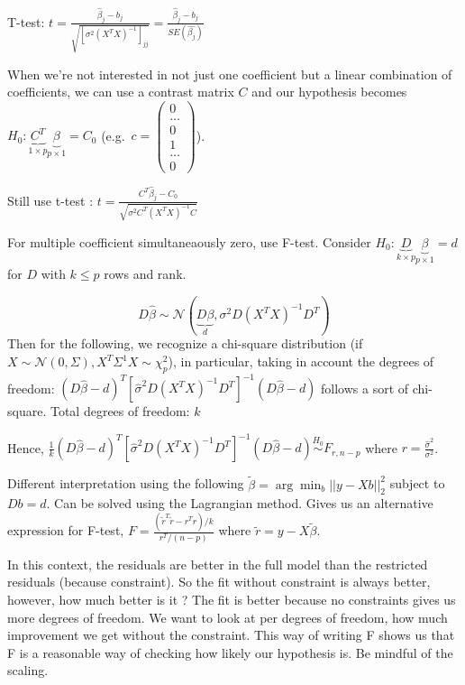 \documentclass[
]{article}
\begin{document}
T-test:
\(t=\frac{\hat{\beta}_j-b_j}{\sqrt{[\sigma^2(X^T X)^{-1}]_{jj}}}=\frac{\hat{\beta}_j-b_j}{SE(\hat{\beta_j})}\)

When we're not interested in not just one coefficient but a linear
combination of coefficients, we can use a contrast matrix \(C\) and our
hypothesis becomes
\(H_0 :\underbrace{C^T}_{1\times p}\underbrace{\beta}_{p\times 1}=C_0\)
(e.g.~\(c=\begin{pmatrix}0\\\dots\\0\\1\\\dots\\0\end{pmatrix}\)).

Still use t-test :
\(t=\frac{C^T\hat{\beta}_j-C_0}{\sqrt{\sigma^2C^T(X^T X)^{-1}C}}\)

For multiple coefficient simultaneaously zero, use F-test. Consider
\(H_0 :\underbrace{D}_{k\times p}\underbrace{\beta}_{p\times 1}=d\) for
\(D\) with \(k\leq p\) rows and rank.

\[D\hat{\beta}\sim\mathcal{N}(\underbrace{D\beta}_{d},\sigma^2 D(X^T X)^{-1}D^T)\]
Then for the following, we recognize a chi-square distribution (if
\(X\sim\mathcal{N}(0,\Sigma), X^T\Sigma^1 X\sim\chi_p^2\)), in
particular, taking in account the degrees of freedom:
\((D\hat{\beta}-d)^T [\hat{\sigma}^2 D(X^T X)^{-1}D^T]^{-1}(D\hat{\beta}-d)\)
follows a sort of chi-square. Total degrees of freedom: \(k\)

Hence,
\(\frac{1}{k}(D\hat{\beta}-d)^T [\hat{\sigma}^2 D(X^T X)^{-1}D^T]^{-1}(D\hat{\beta}-d)\overset{H_0}{\sim}F_{r, n-p}\)
where \(r=\frac{\hat{\sigma}^2}{\sigma^2}\).

Different interpretation using the following
\(\tilde{\beta}=\arg\min_{b}||y-Xb||_2^2\) subject to \(Db=d\). Can be
solved using the Lagrangian method. Gives us an alternative expression
for F-test, \(F=\frac{(\tilde{r}^T\tilde{r}-r^T r)/k}{r^T /(n-p)}\)
where \(\tilde{r}=y-X\tilde{\beta}\).

In this context, the residuals are better in the full model than the
restricted residuals (because constraint). So the fit without constraint
is always better, however, how much better is it ? The fit is better
because no constraints gives us more degrees of freedom. We want to look
at per degrees of freedom, how much improvement we get without the
constraint. This way of writing F shows us that F is a reasonable way of
checking how likely our hypothesis is. Be mindful of the scaling.
\end{document}
